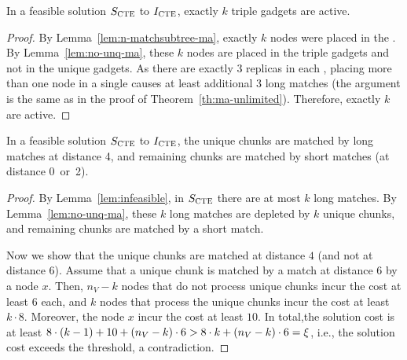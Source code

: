 \begin{lemma}
  In a feasible solution $S_{\mathrm{\textsc{CTE}}}$ to $I_{\mathrm{\textsc{CTE}}}$, exactly $k$ triple gadgets are active.
  \label{lem:n-active-ma}
\end{lemma}
\begin{proof}
  By Lemma~\ref{lem:n-matchsubtree-ma}, exactly $k$ nodes were placed in the \MatchSubtree{}.
  By Lemma~\ref{lem:no-unq-ma}, these $k$ nodes are placed in the triple gadgets and not in the unique gadgets.
As there are exactly $3$ replicas in each \TripleGadget{}, placing more than one node in a single \TripleGadget{} causes at least additional $3$ long matches (the argument is the same as in the proof of Theorem~\ref{th:ma-unlimited}).
Therefore, exactly $k$ \TripleGadgets{} are active.
\end{proof}

\begin{lemma}
  In a feasible solution $S_{\mathrm{\textsc{CTE}}}$ to $I_{\mathrm{\textsc{CTE}}}$, the unique chunks are matched by long matches at distance 4, and remaining chunks are matched by short matches (at distance 0~or~2).
  \label{lem:short-ma}
\end{lemma}
\begin{proof}
  By Lemma~\ref{lem:infeasible}, in $S_{\mathrm{\textsc{CTE}}}$ there are at most $k$ long matches.
  By Lemma~\ref{lem:no-unq-ma}, these $k$ long matches are depleted by $k$ unique chunks, and remaining chunks are matched by a short match.

  Now we show that the unique chunks are matched at distance $4$ (and not at distance $6$).
  Assume that a unique chunk is matched by a match at distance $6$ by a node $x$.
  Then, $n_V - k$ nodes that do not process unique chunks incur the cost at least $6$ each,
  and $k$ nodes that process the unique chunks incur the cost at least $k\cdot 8$.
  Moreover, the node $x$ incur the cost at least $10$.
  In total,the solution cost is at least $8\cdot (k-1) + 10 + (n_V-k)\cdot 6 > 8\cdot k + (n_V-k)\cdot 6 = \xi$, i.e., the solution cost exceeds the threshold, a contradiction.
\end{proof}

